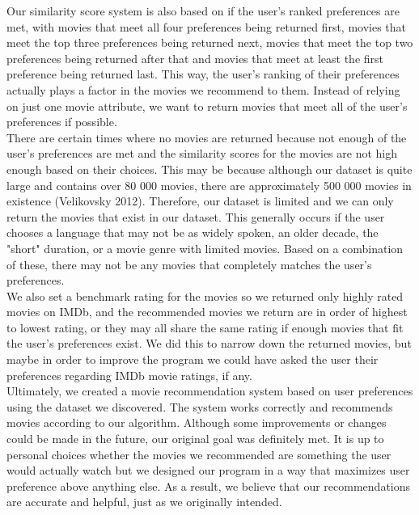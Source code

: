 \documentclass[fontsize=11pt]{article}
\begin{document}
Our similarity score system is also based on if the user's ranked preferences are met, with movies that meet all four preferences being returned first, movies that meet the top three preferences being returned next, movies that meet the top two preferences being returned after that and movies that meet at least the first preference being returned last. This way, the user's ranking of their preferences actually plays a factor in the movies we recommend to them. Instead of relying on just one movie attribute, we want to return movies that meet all of the user's preferences if possible.\\

There are certain times where no movies are returned because not enough of the user's preferences are met and the similarity scores for the movies are not high enough based on their choices. This may be because although our dataset is quite large and contains over 80 000 movies, there are approximately 500 000 movies in existence (Velikovsky 2012). Therefore, our dataset is limited and we can only return the movies that exist in our dataset. This generally occurs if the user chooses a language that may not be as widely spoken, an older decade, the "short" duration, or a movie genre with limited movies. Based on a combination of these, there may not be any movies that completely matches the user's preferences. \\

We also set a benchmark rating for the movies so we returned only highly rated movies on IMDb, and the recommended movies we return are in order of highest to lowest rating, or they may all share the same rating if enough movies that fit the user's preferences exist. We did this to narrow down the returned movies, but maybe in order to improve the program we could have asked the user their preferences regarding IMDb movie ratings, if any.\\

Ultimately, we created a movie recommendation system based on user preferences using the dataset we discovered. The system works correctly and recommends movies according to our algorithm. Although some improvements or changes could be made in the future, our original goal was definitely met. It is up to personal choices whether the movies we recommended are something the user would actually watch but we designed our program in a way that maximizes user preference above anything else. As a result, we believe that our recommendations are accurate and helpful, just as we originally intended. \\
\end{document}
